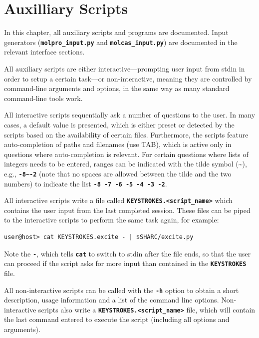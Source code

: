 \documentclass[a4paper,10pt,DIV=15,openany,twoside=false]{scrbook}
\newcommand{\ttt}[1]{\textbf{\texttt{#1}}}
\begin{document}

\chapter{Auxilliary Scripts}\label{chap:aux}

In this chapter, all auxiliary scripts and programs are documented. Input generators (\ttt{molpro\_input.py} and \ttt{molcas\_input.py}) are documented in the relevant interface sections.

All auxiliary scripts are either interactive---prompting user input from stdin in order to setup a certain task---or non-interactive, meaning they are controlled by command-line arguments and options, in the same way as many standard command-line tools work.

All interactive scripts sequentially ask a number of questions to the user. In many cases, a default value is presented, which is either preset or detected by the scripts based on the availability of certain files. Furthermore, the scripts feature auto-completion of paths and filenames (use TAB), which is active only in questions where auto-completion is relevant. For certain questions where lists of integers needs to be entered, ranges can be indicated with the tilde symbol (\textasciitilde), e.g., \ttt{-8\textasciitilde-2} (note that no spaces are allowed between the tilde and the two numbers) to indicate the list \ttt{-8 -7 -6 -5 -4 -3 -2}. 

All interactive scripts write a file called \ttt{KEYSTROKES.<script\_name>} which contains the user input from the last completed session. These files can be piped to the interactive scripts to perform the same task again, for example:
\begin{verbatim}
user@host> cat KEYSTROKES.excite - | $SHARC/excite.py
\end{verbatim}
Note the \ttt{-}, which tells \ttt{cat} to switch to stdin after the file ends, so that the user can proceed if the script asks for more input than contained in the \ttt{KEYSTROKES} file.

All non-interactive scripts can be called with the \ttt{-h} option to obtain a short description, usage information and a list of the command line options.
Non-interactive scripts also write a \ttt{KEYSTROKES.<script\_name>} file, which will contain the last command entered to execute the script (including all options and arguments).
\end{document}
